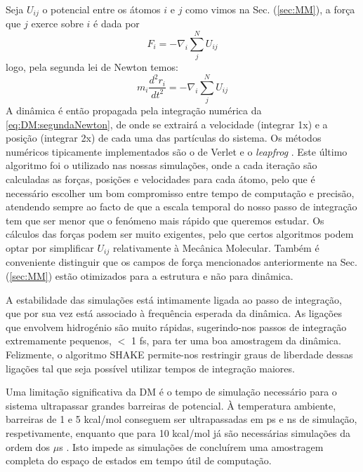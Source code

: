 \documentclass[12pt,a4paper]{article}
\begin{document}
	Seja $U_{ij}$ o potencial entre os átomos $i$ e $j$ como vimos na Sec. (\ref{sec:MM}), a força que $j$ exerce sobre $i$ é dada por
	\begin{equation}
		F_i=-\nabla_{i} \sum_{j}^{N} U_{i j}
	\end{equation}
	logo, pela segunda lei de Newton temos:
	\begin{equation}
		m_{i} \frac{d^{2} r_{i}}{d t^{2}}=-\nabla_{i} \sum_{j}^{N} U_{i j}
		\label{eq:DM:segundaNewton}
	\end{equation}
	A dinâmica é então propagada pela integração numérica da \cref{eq:DM:segundaNewton}, de onde se extrairá a velocidade (integrar 1x) e a posição (integrar 2x) de cada uma das partículas do sistema. Os métodos numéricos tipicamente implementados são o de Verlet e o \textit{leapfrog} \cite{newman2013computational}. Este último algoritmo foi o utilizado nas nossas simulações, onde a cada iteração são calculadas as forças, posições e velocidades para cada átomo, pelo que é necessário escolher um bom compromisso entre tempo de computação e precisão, atendendo sempre ao facto de que a escala temporal do nosso passo de integração tem que ser menor que o fenómeno mais rápido que queremos estudar.
	Os cálculos das forças podem ser muito exigentes, pelo que certos algoritmos podem optar por simplificar $U_{ij}$ relativamente à Mecânica Molecular. Também é conveniente distinguir que os campos de força mencionados anteriormente na Sec. (\ref{sec:MM}) estão otimizados para a estrutura e não para dinâmica.
	
	A estabilidade das simulações está intimamente ligada ao passo de integração, que por sua vez está associado à frequência esperada da dinâmica. As ligações que envolvem hidrogénio são muito rápidas, sugerindo-nos passos de integração extremamente pequenos, $<$ 1 fs, para ter uma boa amostragem da dinâmica. Felizmente, o algoritmo SHAKE \cite{ryckaertNumericalIntegrationCartesian1977} permite-nos restringir graus de liberdade dessas ligações tal que seja possível utilizar tempos de integração maiores.
	
	Uma limitação significativa da DM é o tempo de simulação necessário para o sistema ultrapassar grandes barreiras de potencial. À temperatura ambiente, barreiras de 1 e 5 kcal/mol conseguem ser ultrapassadas em ps e ns de simulação, respetivamente, enquanto que para 10 kcal/mol já são necessárias simulações da ordem dos $\mu$s \cite{cheathamMolecularModelingNucleic2001}. Isto impede as simulações de concluírem uma amostragem completa do espaço de estados em tempo útil de computação.
	
\end{document}
